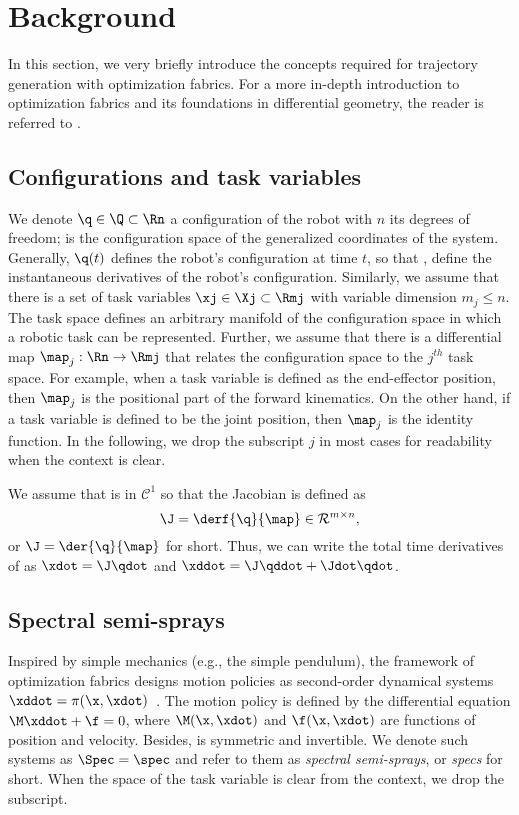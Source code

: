\section{Background}
\label{sec:optimization_fabrics}
%
In this section, we very briefly introduce the concepts required for trajectory
generation with optimization fabrics. For a more in-depth introduction to
optimization fabrics and its foundations in differential geometry, the reader
is referred to \cite{Ratliff2020,Spahn2023,Wyk2022}.
%
\subsection{Configurations and task variables}%
\label{sub:configurations_and_task_variables}
%
We denote $\q\in\Q\subset\Rn$ a
configuration of the robot with $n$ its degrees of freedom;
\Q{} is the configuration space of the generalized coordinates
of the system. Generally, $\q(t)$ defines the robot's configuration at time $t$, so that 
\qdot, \qddot{} define the instantaneous derivatives of the robot's configuration.
Similarly, we assume
that there is a set of task variables $\xj\in\Xj\subset\Rmj$ with variable dimension
$m_j \leq n$. The task space \Xj{} defines an arbitrary manifold of the configuration
space \Q{} in which a robotic task can be represented. 
Further, we assume that there is a differential map
$\map_j:\Rn\rightarrow\Rmj$ that relates the configuration space to the $j^{th}$ task
space. For example, when a task variable is defined as the end-effector position, then
$\map_j$ is the positional part of the forward kinematics. On the other hand, if a task
variable is defined to be the joint position, then $\map_j$ is the identity function. 
In the following, we drop the subscript $j$ in most cases for readability when the
context is clear.

We assume that \map{} is in $\mathcal{C}^1$ so that the Jacobian is
defined as
\begin{equation}
  \J = \derf{\q}{\map} \in \mathcal{R}^{m\times n}, 
\end{equation}
or $\J = \der{\q}{\map}$ for short.
Thus, we can write the total time derivatives of \x{} as
$\xdot = \J\qdot$ and $\xddot = \J\qddot + \Jdot\qdot$.
%
\subsection{Spectral semi-sprays}%
\label{sub:semi_spectral_sprays}
%
Inspired by simple mechanics (e.g., the simple pendulum), the framework of optimization
fabrics designs motion policies as second-order dynamical
systems $\xddot = \pi(\x,\xdot)$~\cite{Cheng2020,Ratliff2020}.
The motion policy is defined by the differential equation
$\M\xddot + \f = 0$, where $\M(\x,\xdot)$ and $\f(\x,\xdot)$ are functions of position and
velocity. Besides, \M{} is symmetric and invertible. We denote such systems as $\Spec = \spec$ and
refer to them as \textit{spectral semi-sprays}, or \textit{specs} for short.  When the space of
the task variable is clear from the context, we drop the subscript. 


